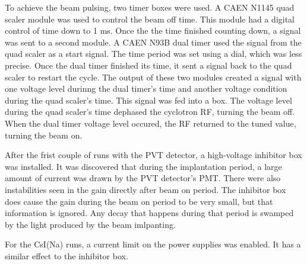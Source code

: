 To achieve the beam pulsing, two timer boxes were used.
A CAEN N1145 quad scaler module was used to control the beam off time.
This module had a digital control of time down to 1 ms.
Once the the time finished counting down, a signal was sent to a second module. 
A CAEN N93B dual timer used the signal from the quad scaler as a start signal.
The time period was set using a dial, which was less precise. 
Once the dual timer finished its time, it sent a signal back to the quad scaler to restart the cycle.
The output of these two modules created a signal with one voltage level durinng the dual timer's time and another voltage condition during the quad scaler's time.
This signal was fed into a box.
The voltage level during the quad scaler's time dephased the cyclotron RF, turning the beam off.
When the dual timer voltage level occured, the RF returned to the tuned value, turning the beam on.  

After the frist couple of runs with the PVT detector, a high-voltage inhibitor box was installed.
It was discovered that during the implantation period, a large amount of current was drawn by the PVT detector's PMT. 
There were also instabilities seen in the gain directly after beam on period.
The inhibitor box does cause the gain during the beam on period to be very small, but that information is ignored.
Any decay that happens during that period is swamped by the light produced by the beam imlpanting.

For the CsI(Na) runs, a current limit on the power supplies was enabled.
It has a similar effect to the inhibitor box. 

